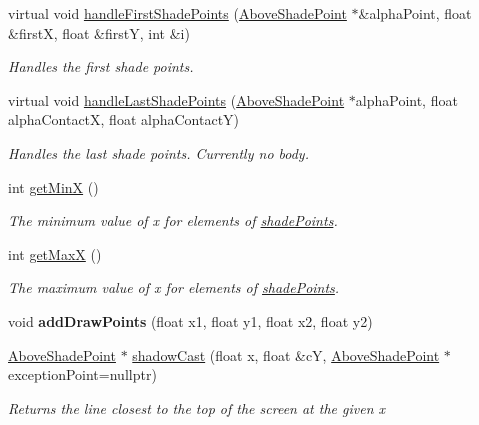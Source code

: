 \begin{DoxyCompactItemize}
virtual void \hyperlink{classlighting_1_1AboveLightSource_a43c39f611519c6f94a8a8a8165ed8a64}{handle\+First\+Shade\+Points} (\hyperlink{classlighting_1_1AboveShadePoint}{Above\+Shade\+Point} $\ast$\&alpha\+Point, float \&firstX, float \&firstY, int \&i)
\begin{DoxyCompactList}\small\item\em Handles the first shade points. \end{DoxyCompactList}\item 
virtual void \hyperlink{classlighting_1_1AboveLightSource_a4752f8d26b2d2584e79f5dbbe93f043d}{handle\+Last\+Shade\+Points} (\hyperlink{classlighting_1_1AboveShadePoint}{Above\+Shade\+Point} $\ast$alpha\+Point, float alpha\+ContactX, float alpha\+ContactY)
\begin{DoxyCompactList}\small\item\em Handles the last shade points. Currently no body. \end{DoxyCompactList}\item 
int \hyperlink{classlighting_1_1AboveLightSource_a113938f6773c454f6c36e553df6f1886}{get\+MinX} ()
\begin{DoxyCompactList}\small\item\em The minimum value of x for elements of \hyperlink{classlighting_1_1AboveLightSource_a255e98bb6aae0099178cb7aa2d9671a5}{shade\+Points}. \end{DoxyCompactList}\item 
int \hyperlink{classlighting_1_1AboveLightSource_a5818e15ade8eaaeb20ecb02c198e57bf}{get\+MaxX} ()
\begin{DoxyCompactList}\small\item\em The maximum value of x for elements of \hyperlink{classlighting_1_1AboveLightSource_a255e98bb6aae0099178cb7aa2d9671a5}{shade\+Points}. \end{DoxyCompactList}\item 
void {\bfseries add\+Draw\+Points} (float x1, float y1, float x2, float y2)\hypertarget{classlighting_1_1AboveLightSource_a926900f786af28265cac95751c3ce2ac}{}\label{classlighting_1_1AboveLightSource_a926900f786af28265cac95751c3ce2ac}

\item 
\hyperlink{classlighting_1_1AboveShadePoint}{Above\+Shade\+Point} $\ast$ \hyperlink{classlighting_1_1AboveLightSource_ac65260afb16ddd15ff49628168268cdb}{shadow\+Cast} (float x, float \&cY, \hyperlink{classlighting_1_1AboveShadePoint}{Above\+Shade\+Point} $\ast$exception\+Point=nullptr)
\begin{DoxyCompactList}\small\item\em Returns the line closest to the top of the screen at the given {\itshape x}  \end{DoxyCompactList}\end{DoxyCompactItemize}
